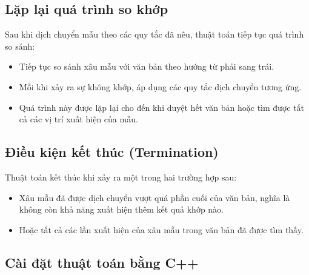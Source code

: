 \subsection{Lặp lại quá trình so khớp}
Sau khi dịch chuyển mẫu theo các quy tắc đã nêu, thuật toán tiếp tục quá trình so sánh:

\begin{itemize}
    \item Tiếp tục so sánh xâu mẫu với văn bản theo hướng từ phải sang trái.
    \item Mỗi khi xảy ra sự không khớp, áp dụng các quy tắc dịch chuyển tương ứng.
    \item Quá trình này được lặp lại cho đến khi duyệt hết văn bản hoặc tìm được tất cả các vị trí xuất hiện của mẫu.
\end{itemize}

\subsection{Điều kiện kết thúc (Termination)}
Thuật toán kết thúc khi xảy ra một trong hai trường hợp sau:

\begin{itemize}
    \item Xâu mẫu đã được dịch chuyển vượt quá phần cuối của văn bản, nghĩa là không còn khả năng xuất hiện thêm kết quả khớp nào.
    \item Hoặc tất cả các lần xuất hiện của xâu mẫu trong văn bản đã được tìm thấy.
\end{itemize}

\subsection{Cài đặt thuật toán bằng C++}

